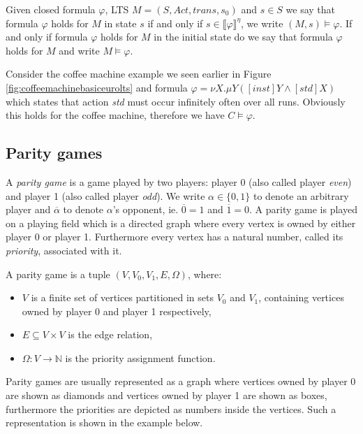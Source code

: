 Given closed formula $\varphi$, LTS $M = (S, Act, trans, s_0)$ and $s \in S$ we say that formula $\varphi$ holds for $M$ in state $s$ if and only if $s \in \llbracket \varphi \rrbracket^\eta$, we write $(M,s) \models \varphi$. If and only if formula $\varphi$ holds for $M$ in the initial state do we say that formula $\varphi$ holds for $M$ and write $M \models \varphi$. 

\begin{example}
	Consider the coffee machine example we seen earlier in Figure \ref{fig:coffeemachinebasiceurolts} and formula $\varphi = \nu X. \mu Y([inst]Y \wedge [std]X)$ which states that action \textit{std} must occur infinitely often over all runs. Obviously this holds for the coffee machine, therefore we have $C \models \varphi$.
\end{example}

\subsection{Parity games}
A \textit{parity game} is a game played by two players: player 0 (also called player \textit{even}) and player 1 (also called player \textit{odd}). We write $\alpha \in \{0,1\}$ to denote an arbitrary player and $\overline{\alpha}$ to denote $\alpha$'s opponent, ie. $\overline{0} = 1$ and $\overline{1} = 0$. A parity game is played on a playing field which is a directed graph where every vertex is owned by either player 0 or player 1. Furthermore every vertex has a natural number, called its \textit{priority}, associated with it.
\begin{definition}
	\label{def_PG}\cite{Bradfield2018}
	A parity game is a tuple $(V, V_0, V_1, E, \Omega)$, where:
	\begin{itemize}
		\item $V$ is a finite set of vertices partitioned in sets $V_0$ and $V_1$, containing vertices owned by player 0 and player 1 respectively,
		\item $E \subseteq V \times V$ is the edge relation,
		\item $\Omega :  V \rightarrow \mathbb{N}$ is the priority assignment function.
	\end{itemize}
\end{definition}
Parity games are usually represented as a graph where vertices owned by player 0 are shown as diamonds and vertices owned by player 1 are shown as boxes, furthermore the priorities are depicted as numbers inside the vertices. Such a representation is shown in the example below.

